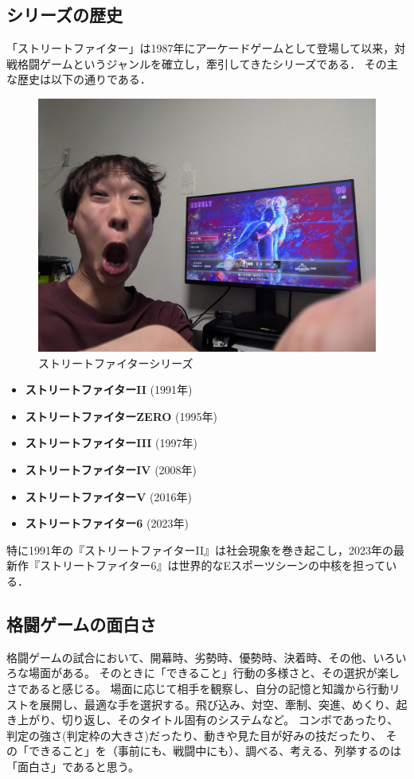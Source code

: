 \documentclass[twocolumn, a4paper]{Zemiresume}
\begin{document}
\subsection{シリーズの歴史}
「ストリートファイター」は1987年にアーケードゲームとして登場して以来，対戦格闘ゲームというジャンルを確立し，牽引してきたシリーズである．
その主な歴史は以下の通りである\cite{cite:sf_history}．
\begin{figure}[t]
  \centering
  \includegraphics[width=\columnwidth]{img/SF6_Master.jpg}
  \caption{ストリートファイターシリーズ}\label{fig:sf6_master}
\end{figure}
\begin{itemize}
    \item \textbf{ストリートファイターII} (1991年)
    \item \textbf{ストリートファイターZERO} (1995年)
    \item \textbf{ストリートファイターIII} (1997年)
    \item \textbf{ストリートファイターIV} (2008年)
    \item \textbf{ストリートファイターV} (2016年)
    \item \textbf{ストリートファイター6} (2023年)
\end{itemize}
特に1991年の『ストリートファイターII』は社会現象を巻き起こし，2023年の最新作『ストリートファイター6』は世界的なEスポーツシーンの中核を担っている．

\subsection{格闘ゲームの面白さ}
格闘ゲームの試合において、開幕時、劣勢時、優勢時、決着時、その他、いろいろな場面がある。
そのときに「できること」行動の多様さと、その選択が楽しさであると感じる。
場面に応じて相手を観察し、自分の記憶と知識から行動リストを展開し、最適な手を選択する。飛び込み、対空、牽制、突進、めくり、起き上がり、切り返し、そのタイトル固有のシステムなど。
コンボであったり、判定の強さ(判定枠の大きさ)だったり、動きや見た目が好みの技だったり、
その「できること」を（事前にも、戦闘中にも）、調べる、考える、列挙するのは「面白さ」であると思う。
\end{document}
